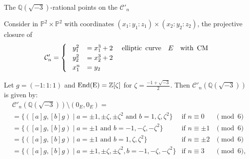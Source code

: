 \documentclass[handout]{beamer}
\newcommand{\qe}{\mathbb{Q}}
\newcommand{\Ci}{\mathcal{C}}
\begin{document}
 \begin{frame}{ The  $\qe(\sqrt{-3})$-rational points on the  $\Ci'_n$ }
 \begin{example}
Consider in $\mathbb{P}^2\times\mathbb{P}^2$ with coordinates  $(x_1:y_1:z_1)\times (x_2:y_2:z_2)$, the projective closure of
\begin{equation*}
\mathcal{C}'_n=\begin{cases}
\,\,\,\,\,y_1^2&=x_1^3+2\,\,\,\,\,\,\,\,{\rm{elliptic \,\,\, curve}\quad} E \quad {\rm{with \,\,\, CM}}\\
\,\,\,\,\,y_2^2&=x_2^3+2\,\,\,\,\,\,\,\,\\
\,\,\,\,\,x_1^n&=y_2
\end{cases}
\end{equation*}

 \begin{alertblock}{Let $g=(-1:1:1)$ and  $\rm{End}
    (E)=\mathbb{Z}[\zeta]$ for $\zeta=\frac{-1+\sqrt{-3}}{2}$. Then $\Ci'_n(\qe(\sqrt{-3}))$ is given by:} 
     \begin{align*}
	&\Ci'_n(\qe(\sqrt{-3}))\setminus {(0_E,0_E)} = & & \\
	&=\{([a] g, [b] g)\mid a=\pm 1, \pm \zeta, \pm \zeta^2\text{ and }b=1,\zeta,\zeta^2\}	&\text{if }n\equiv 0&\pmod 6\\
	&=\{([a ] g, [b ]g)\mid a=\pm 1\text{ and }b=-1,-\zeta,-\zeta^2\}	&\text{if }n\equiv \pm 1&\pmod 6\\
	&=\{([a ]g, [b] g)\mid a=\pm 1\text{ and }b=1,\zeta,\zeta^2\}	&\text{if }n\equiv \pm 2&\pmod 6\\
	&=\{([a] g, [b] g)\mid a=\pm 1, \pm \zeta, \pm \zeta^2, b=-1,-\zeta,-\zeta^2\}	&\text{if }n\equiv 3&\pmod 6,
     \end{align*}
 \end{alertblock}
 \end{example}
 \end{frame}
\end{document}
